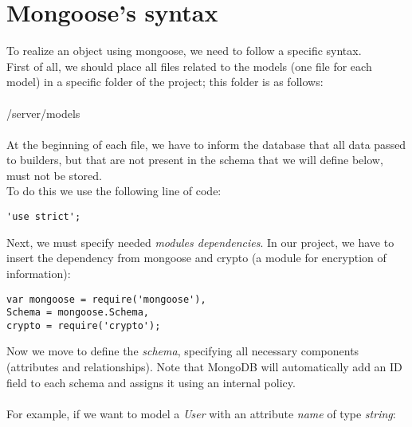 \section{Mongoose's syntax}
To realize an object using mongoose, we need to follow a specific syntax.
\\First of all, we should place all files related to the models (one file for each model) in a specific folder of the project; this folder is as follows:
\\
\\/server/models
\\
\\At the beginning of each file, we have to inform the database that all data passed to builders, but that are not present in the schema that we will define below, must not be stored.
\\To do this we use the following line of code:


\begin{lstlisting}
'use strict';
\end{lstlisting}


Next, we must specify needed \emph{modules dependencies}. In our project, we have to insert the dependency from mongoose and crypto (a module for encryption of information):


\begin{lstlisting}      
var mongoose = require('mongoose'),
Schema = mongoose.Schema,
crypto = require('crypto');
\end{lstlisting}


Now we move to define the \emph{schema}, specifying all necessary components (attributes and relationships). Note that MongoDB will automatically add an ID field to each schema and assigns it using an internal policy.
\\
\\For example, if we want to model a \emph{User} with an attribute \emph{name} of type \emph{string}:

\newpage

